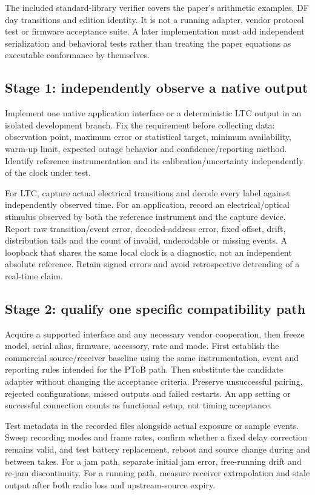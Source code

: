 \documentclass[11pt,letterpaper]{article}
\begin{document}
The included standard-library verifier covers the paper's arithmetic examples, DF day transitions and edition identity. It is not a running adapter, vendor protocol test or firmware acceptance suite. A later implementation must add independent serialization and behavioral tests rather than treating the paper equations as executable conformance by themselves.

\subsection{Stage 1: independently observe a native output}
Implement one native application interface or a deterministic LTC output in an isolated development branch. Fix the requirement before collecting data: observation point, maximum error or statistical target, minimum availability, warm-up limit, expected outage behavior and confidence/reporting method. Identify reference instrumentation and its calibration/uncertainty independently of the clock under test.

For LTC, capture actual electrical transitions and decode every label against independently observed time. For an application, record an electrical/optical stimulus observed by both the reference instrument and the capture device. Report raw transition/event error, decoded-address error, fixed offset, drift, distribution tails and the count of invalid, undecodable or missing events. A loopback that shares the same local clock is a diagnostic, not an independent absolute reference. Retain signed errors and avoid retrospective detrending of a real-time claim.

\subsection{Stage 2: qualify one specific compatibility path}
Acquire a supported interface and any necessary vendor cooperation, then freeze model, serial alias, firmware, accessory, rate and mode. First establish the commercial source/receiver baseline using the same instrumentation, event and reporting rules intended for the PToB path. Then substitute the candidate adapter without changing the acceptance criteria. Preserve unsuccessful pairing, rejected configurations, missed outputs and failed restarts. An app setting or successful connection counts as functional setup, not timing acceptance.

Test metadata in the recorded files alongside actual exposure or sample events. Sweep recording modes and frame rates, confirm whether a fixed delay correction remains valid, and test battery replacement, reboot and source change during and between takes. For a jam path, separate initial jam error, free-running drift and re-jam discontinuity. For a running path, measure receiver extrapolation and stale output after both radio loss and upstream-source expiry.
\end{document}
